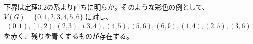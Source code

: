 \subsection{}
下界は定理3.2の系より直ちに明らか。そのような彩色の例として、$V(G)=\{0,1,2,3,4,5,6\}$ に対し、
\begin{align*}
(0,1),(1,2),(2,3),
(3,4),(4,5),(5,6),(6,0),
(1,4),(2,5),(3,6)
\end{align*}
を赤く、残りを青くするものが存在する。
